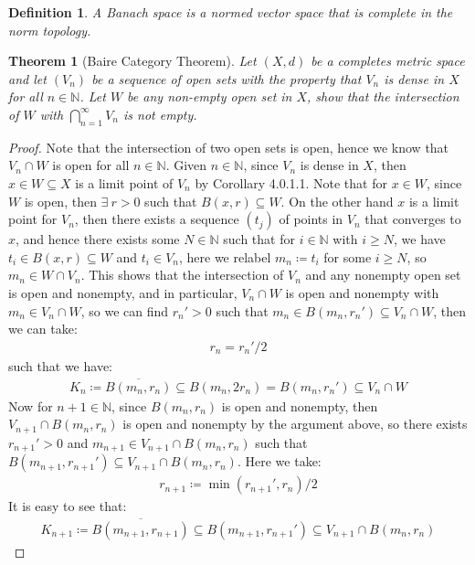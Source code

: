 \documentclass[11pt]{book}
\theoremstyle{break}
\theoremstyle{break}
\newtheorem{thm}{Theorem}[section]
\newtheorem{defn}{Definition}[corL]
\newcommand{\N}{\mathbb{N}}
\begin{document}
\begin{defn}
A Banach space is a normed vector space that is complete in the norm topology. 
\end{defn}

\begin{thm}[Baire Category Theorem]
Let $(X,d)$ be a completes metric space and let $(V_n)$ be a sequence of open sets with the property that $V_n$ is dense in $X$ for all $n \in \N$. Let $W$ be any  non-empty open set in $X$, show that the intersection of $W$ with $\bigcap_{n=1}^\infty V_n$ is not empty. 
\end{thm}

\begin{proof}
Note that the intersection of two open sets is open, hence we know that $V_n \cap W$ is open for all $n \in \N$. Given $n \in \N$, since $V_n$ is dense in $X$, then $x \in W \subseteq X$ is a limit point of $V_n$ by Corollary 4.0.1.1. Note that for $x \in W$, since $W$ is open, then $\exists\ r >0$ such that $B(x,r) \subseteq W$. On the other hand $x$ is a limit point for $V_n$, then there exists a sequence $(t_j)$ of points in $V_n$ that converges to $x$, and hence there exists some $N \in \N$ such that for $i \in \N$ with $i \geq N$, we have $t_i \in B(x,r)\subseteq W$ and $t_i \in V_n$, here we relabel $m_n \coloneqq t_i$ for some $i \geq N$, so $m_n \in W\cap V_n$. This shows that the intersection of $V_n$ and any nonempty open set is open and nonempty, and in particular, $V_n\cap W$ is open and nonempty with $m_n \in V_n \cap W$, so we can find $r_n' >0$ such that $m_n \in B(m_n, r_n')\subseteq V_n \cap W$, then we can take: 
\begin{align}
r_n = r_n'/2 
\end{align} 
such that we have: 
\begin{align}
K_n \coloneqq \overline{B(m_n, r_n)} \subseteq B(m_n, 2r_n) =B(m_n, r_n') \subseteq V_n \cap W 
\end{align}
Now for $n+1 \in \N$, since $B(m_n, r_n)$ is open and nonempty, then $V_{n+1} \cap B(m_n, r_n)$ is open and nonempty by the argument above, so there exists $r_{n+1}' >0$ and $m_{n+1} \in V_{n+1}\cap B(m_n, r_n)$ such that $B(m_{n+1}, r_{n+1}') \subseteq V_{n+1} \cap B(m_n, r_n)$. Here we take:
\begin{align}
r_{n+1} \coloneqq \min(r_{n+1}', r_n)/2
\end{align} 
It is easy to see that: 
\begin{align}
K_{n+1}\coloneqq \overline{B(m_{n+1}, r_{n+1})}\subseteq B(m_{n+1}, r_{n+1}') \subseteq V_{n+1}\cap B(m_n, r_n) 

\end{align}
\end{proof}
\end{document}
